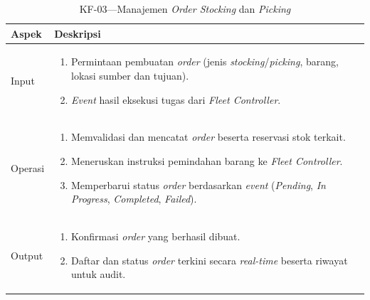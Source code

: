 \begin{xltabular}{\textwidth}{ | l | X | }
  \caption{KF-03---Manajemen \textit{Order Stocking} dan \textit{Picking}} \label{tab:kf03} \\
  \hline
  \textbf{Aspek} & \textbf{Deskripsi} \\
  \hline
  \endfirsthead
  \hline
  \endfoot
  Input &
  \begin{enumerate}[leftmargin=*,nosep]
    \item Permintaan pembuatan \textit{order} (jenis \textit{stocking}/\textit{picking}, barang, lokasi sumber dan tujuan).
    \item \textit{Event} hasil eksekusi tugas dari \textit{Fleet Controller}.
  \end{enumerate} \\
  \hline
  Operasi &
  \begin{enumerate}[leftmargin=*,nosep]
    \item Memvalidasi dan mencatat \textit{order} beserta reservasi stok terkait.
    \item Meneruskan instruksi pemindahan barang ke \textit{Fleet Controller}.
    \item Memperbarui status \textit{order} berdasarkan \textit{event} (\textit{Pending}, \textit{In Progress}, \textit{Completed}, \textit{Failed}).
  \end{enumerate} \\
  \hline
  Output &
  \begin{enumerate}[leftmargin=*,nosep]
    \item Konfirmasi \textit{order} yang berhasil dibuat.
    \item Daftar dan status \textit{order} terkini secara \textit{real-time} beserta riwayat untuk audit.
  \end{enumerate} \\
  \hline
\end{xltabular}

